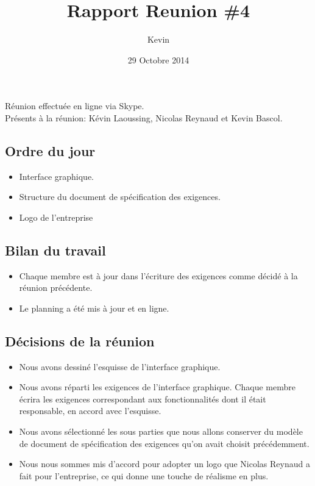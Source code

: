 \documentclass{article}
\title{Rapport Reunion \#4}
\author{Kevin \bsc{Bascol}}
\date{29 Octobre 2014}
\begin{document}
\maketitle
\newpage

Réunion effectuée en ligne via Skype.\\
Présents à la réunion: Kévin Laoussing, Nicolas Reynaud et Kevin Bascol.

\subsection*{Ordre du jour}
	\begin{itemize}
		\item Interface graphique.
		\item Structure du document de spécification des exigences.
		\item Logo de l'entreprise
	\end{itemize}

\subsection*{Bilan du travail}
	\begin{itemize}
		\item Chaque membre est à jour dans l'écriture des exigences comme décidé à la réunion précédente.
		\item Le planning a été mis à jour et en ligne.
	\end{itemize}
	
\subsection*{Décisions de la réunion}
	\begin{itemize}
		\item Nous avons dessiné l'esquisse de l'interface graphique.
		\item Nous avons réparti les exigences de l'interface graphique. Chaque membre écrira les exigences correspondant aux fonctionnalités dont il était responsable, en accord avec l'esquisse.
		\item Nous avons sélectionné les sous parties que nous allons conserver du modèle de document de spécification des exigences qu'on avait choisit précédemment.
		\item Nous nous sommes mis d'accord pour adopter un logo que Nicolas Reynaud a fait pour l'entreprise, ce qui donne une touche de réalisme en plus.
	\end{itemize}
	
\end{document}
